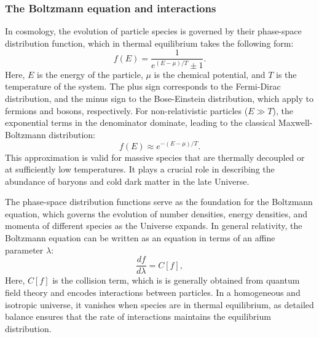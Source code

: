 \documentclass{aa}
\numberwithin{equation}{section}
\numberwithin{table}{section}
\numberwithin{figure}{section}
\begin{document}
\subsubsection{The Boltzmann equation and interactions}\label{subsubsec: II theory interactions}
In cosmology, the evolution of particle species is governed by their phase-space distribution function, which in thermal equilibrium takes the following form:
\begin{equation}
f(E) = \frac{1}{e^{(E - \mu) / T} \pm 1}. \label{eq: distribution}
\end{equation}
Here, $E$ is the energy of the particle, $\mu$ is the chemical potential, and $T$ is the temperature of the system. The plus sign corresponds to the Fermi-Dirac distribution, and the minus sign to the Bose-Einstein distribution, which apply to fermions and bosons, respectively. For non-relativistic particles ($E \gg T$), the exponential terms in the denominator dominate, leading to the classical Maxwell-Boltzmann distribution:
\begin{equation}
f(E) \approx e^{-(E - \mu) / T}. \label{eq: Maxwell}
\end{equation}
This approximation is valid for massive species that are thermally decoupled or at sufficiently low temperatures. It plays a crucial role in describing the abundance of baryons and cold dark matter in the late Universe.

The phase-space distribution functions serve as the foundation for the Boltzmann equation, which governs the evolution of number densities, energy densities, and momenta of different species as the Universe expands. In general relativity, the Boltzmann equation can be written as an equation in terms of an affine parameter $\lambda$:
\begin{equation}
\frac{df}{d\lambda} = C[f], \label{eq: Boltzmann}
\end{equation}
Here, $C[f]$ is the collision term, which is is generally obtained from quantum field theory and encodes interactions between particles. In a homogeneous and isotropic universe, it vanishes when species are in thermal equilibrium, as detailed balance ensures that the rate of interactions maintains the equilibrium distribution.
\end{document}
